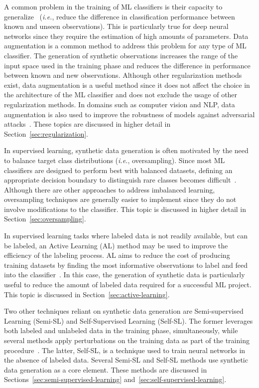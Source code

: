 A common problem in the training of ML classifiers is their
capacity to generalize~\cite{Zhang2021} (\textit{i.e.}, reduce the difference
in classification performance between known and unseen observations). This
is particularly true for deep neural networks since they require the
estimation of high amounts of parameters. Data augmentation is a common
method to address this problem for any type of ML classifier. The generation
of synthetic observations increases the range of the input space used in the
training phase and reduces the difference in performance between known and new
observations. Although other regularization methods exist, data augmentation
is a useful method since it does not affect the choice in the architecture of
the ML classifier and does not exclude the usage of other regularization
methods. In domains such as computer vision and NLP, data augmentation is also
used to improve the robustness of models against adversarial
attacks~\cite{zeng2020data, morris2020textattack}. These topics are discussed
in higher detail in Section~\ref{sec:regularization}.

In supervised learning, synthetic data generation is often motivated by the
need to balance target class distributions (\textit{i.e.}, oversampling).
Since most ML classifiers are designed to perform best with balanced datasets,
defining an appropriate decision boundary to distinguish rare classes becomes
difficult~\cite{saez2016analyzing}. Although there are other approaches to
address imbalanced learning, oversampling techniques are generally easier to
implement since they do not involve modifications to the classifier. This
topic is discussed in higher detail in Section~\ref{sec:oversampling}.

In supervised learning tasks where labeled data is not readily available, but
can be labeled, an Active Learning (AL) method may be used to improve the
efficiency of the labeling process. AL aims to reduce the cost of producing
training datasets by finding the most informative observations to label and
feed into the classifier~\cite{Fonseca2021al}. In this case, the
generation of synthetic data is particularly useful to reduce the amount of
labeled data required for a successful ML project. This topic is discussed in
Section~\ref{sec:active-learning}.

Two other techniques reliant on synthetic data generation are Semi-supervised
Learning (Semi-SL) and Self-Supervised Learning (Self-SL). The former
leverages both labeled and unlabeled data in the training phase,
simultaneously, while several methods apply perturbations on the training data
as part of the training procedure~\cite{Van2020}. The latter, Self-SL,
is a technique used to train neural networks in the absence of labeled data.
Several Semi-SL and Self-SL methods use synthetic data generation as a core
element. These methods are discussed in
Sections~\ref{sec:semi-supervised-learning}
and~\ref{sec:self-supervised-learning}.



